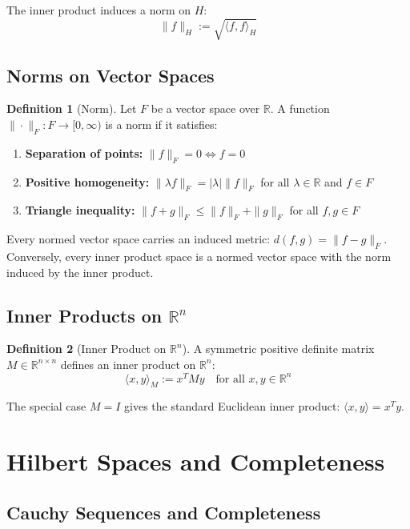 \documentclass[12pt,a4paper]{article}
\theoremstyle{definition}
\newtheorem{definition}{Definition}[section]
\begin{document}
The inner product induces a norm on $H$:
\[
\|f\|_H := \sqrt{\langle f, f \rangle_H}
\]

\subsection{Norms on Vector Spaces}

\begin{definition}[Norm]
Let $F$ be a vector space over $\mathbb{R}$. A function $\|\cdot\|_F : F \to [0, \infty)$ is a norm if it satisfies:

\begin{enumerate}
    \item \textbf{Separation of points:} $\|f\|_F = 0 \Leftrightarrow f = 0$
    \item \textbf{Positive homogeneity:} $\|\lambda f\|_F = |\lambda| \|f\|_F$ for all $\lambda \in \mathbb{R}$ and $f \in F$
    \item \textbf{Triangle inequality:} $\|f + g\|_F \leq \|f\|_F + \|g\|_F$ for all $f, g \in F$
\end{enumerate}
\end{definition}

Every normed vector space carries an induced metric: $d(f, g) = \|f - g\|_F$. Conversely, every inner product space is a normed vector space with the norm induced by the inner product.

\subsection{Inner Products on \texorpdfstring{$\mathbb{R}^n$}{Rn}}

\begin{definition}[Inner Product on $\mathbb{R}^n$]
A symmetric positive definite matrix $M \in \mathbb{R}^{n \times n}$ defines an inner product on $\mathbb{R}^n$:
\[
\langle x, y \rangle_M := x^T M y \quad \text{for all } x, y \in \mathbb{R}^n
\]

The special case $M = I$ gives the standard Euclidean inner product: $\langle x, y \rangle = x^T y$.
\end{definition}

\section{Hilbert Spaces and Completeness}

\subsection{Cauchy Sequences and Completeness}
\end{document}
